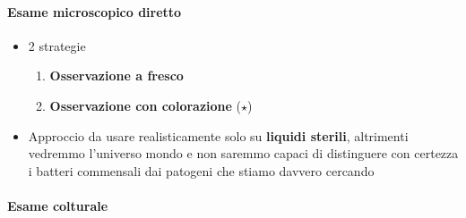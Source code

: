 \documentclass[italian,]{article}
\providecommand{\tightlist}{%
  \setlength{\itemsep}{0pt}\setlength{\parskip}{0pt}}
\begin{document}
\hypertarget{esame-microscopico-diretto}{%
\paragraph{Esame microscopico
diretto}\label{esame-microscopico-diretto}}

\begin{itemize}
\tightlist
\item
  2 strategie

  \begin{enumerate}
  \def\labelenumi{\arabic{enumi}.}
  \tightlist
  \item
    \textbf{Osservazione a fresco}
  \item
    \textbf{Osservazione con colorazione} (\(\star\))
  \end{enumerate}
\item
  Approccio da usare realisticamente solo su \textbf{liquidi sterili},
  altrimenti vedremmo l'universo mondo e non saremmo capaci di
  distinguere con certezza i batteri commensali dai patogeni che stiamo
  davvero cercando
\end{itemize}

\hypertarget{esame-colturale}{%
\paragraph{Esame colturale}\label{esame-colturale}}
\end{document}
